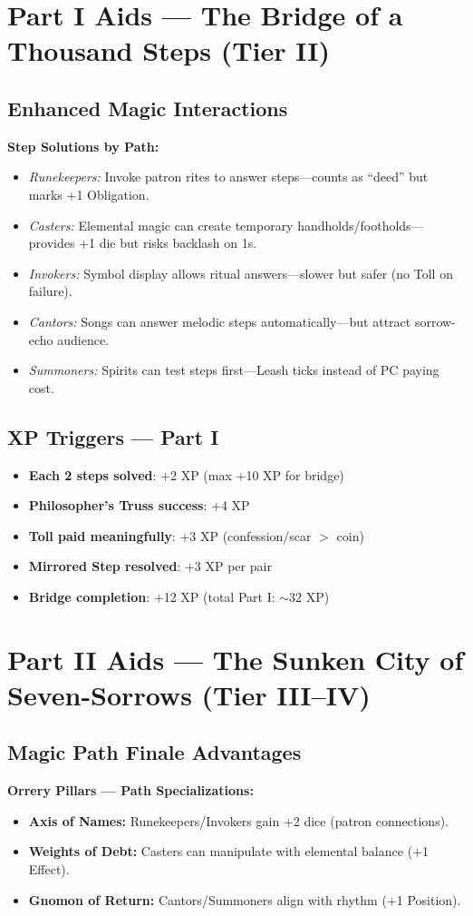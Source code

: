 \documentclass[11pt]{article}
\begin{document}
\section{Part I Aids --- The Bridge of a Thousand Steps (Tier II)}
\label{app:bridge-aids}
\subsection*{Enhanced Magic Interactions}
\textbf{Step Solutions by Path:}
\begin{itemize}
\item \textit{Runekeepers:} Invoke patron rites to answer steps---counts as ``deed'' but marks +1 Obligation.
\item \textit{Casters:} Elemental magic can create temporary handholds/footholds---provides +1 die but risks backlash on 1s.
\item \textit{Invokers:} Symbol display allows ritual answers---slower but safer (no Toll on failure).
\item \textit{Cantors:} Songs can answer melodic steps automatically---but attract sorrow-echo audience.
\item \textit{Summoners:} Spirits can test steps first---Leash ticks instead of PC paying cost.
\end{itemize}

\subsection*{XP Triggers --- Part I}
\begin{itemize}
\item \textbf{Each 2 steps solved}: +2 XP (max +10 XP for bridge)
\item \textbf{Philosopher's Truss success}: +4 XP
\item \textbf{Toll paid meaningfully}: +3 XP (confession/scar $>$ coin)
\item \textbf{Mirrored Step resolved}: +3 XP per pair
\item \textbf{Bridge completion}: +12 XP (total Part I: $\sim$32 XP)
\end{itemize}

\section{Part II Aids --- The Sunken City of Seven-Sorrows (Tier III--IV)}
\label{app:sorrows-aids}
\subsection*{Magic Path Finale Advantages}
\textbf{Orrery Pillars --- Path Specializations:}
\begin{itemize}
\item \textbf{Axis of Names:} Runekeepers/Invokers gain +2 dice (patron connections).
\item \textbf{Weights of Debt:} Casters can manipulate with elemental balance (+1 Effect).
\item \textbf{Gnomon of Return:} Cantors/Summoners align with rhythm (+1 Position).
\end{itemize}
\end{document}

